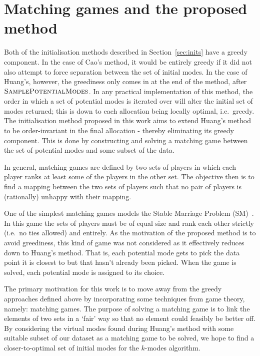 \section{Matching games and the proposed method}\label{sec:method}

Both of the initialisation methods described in Section~\ref{sec:inits} have a
greedy component. In the case of Cao's method, it would be entirely greedy if it
did not also attempt to force separation between the set of initial modes. In
the case of Huang's, however, the greediness only comes in at the end of the
method, after \(\textsc{SamplePotentialModes}\). In any practical implementation
of this method, the order in which a set of potential modes is iterated over
will alter the initial set of modes returned; this is down to each allocation
being locally optimal, i.e.\ greedy. The initialisation method proposed in this
work aims to extend Huang's method to be order-invariant in the final allocation
\-- thereby eliminating its greedy component. This is done by constructing and
solving a matching game between the set of potential modes and some subset of
the data.

In general, matching games are defined by two sets of players in which each
player ranks at least some of the players in the other set. The objective then
is to find a mapping between the two sets of players such that no pair of
players is (rationally) unhappy with their mapping.

One of the simplest matching games models the Stable Marriage Problem
(SM)~\cite{Gale1962}. In this game the sets of players must be of equal size and
rank each other strictly (i.e.\ no ties allowed) and entirely. As the motivation
of the proposed method is to avoid greediness, this kind of game was not
considered as it effectively reduces down to Huang's method. That is, each
potential mode gets to pick the data point it is closest to but that hasn't
already been picked. When the game is solved, each potential mode is assigned to
its choice.

The primary motivation for this work is to move away from the greedy approaches
defined above by incorporating some techniques from game theory, namely:
matching games. The purpose of solving a matching game is to link the elements
of two sets in a `fair' way so that no element could feasibly be better off. By
considering the virtual modes found during Huang's method with some suitable
subset of our dataset as a matching game to be solved, we hope to find a
closer-to-optimal set of initial modes for the \(k\)-modes algorithm.

